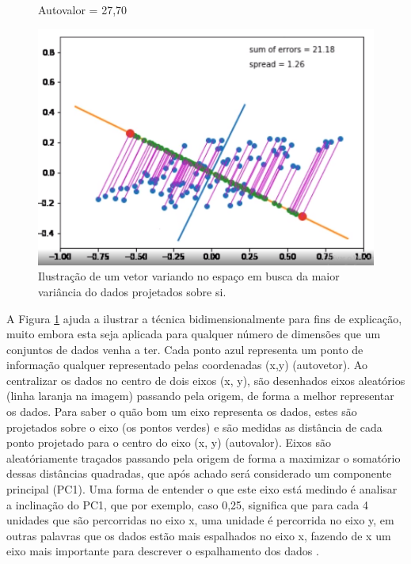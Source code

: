 \documentclass[12pt]{report}
\newcommand*{\captionsource}[2]{%
  \caption[{#1}]{%
    #1%
    \\\hspace{\linewidth}%
     \text{Fonte:}#2%
  }%
}
\begin{document}
\begin{figure}
\begin{minipage}[b]{0.4\textwidth}
    \caption{Autovalor = 27,70}
  \end{minipage}
    \hfill
  \begin{minipage}[b]{0.4\textwidth}
    \includegraphics[width=\textwidth]{images/5.png}
    \caption{Autovalor = 21,18}
  \end{minipage}
  \captionsource{Ilustração de um vetor variando no espaço em busca da maior variância do dados projetados sobre si.}{ \protect\cite{paperspace}}
  \label{fig:animacao_pca}
\end{figure}

A Figura \ref{fig:animacao_pca} ajuda a ilustrar a técnica bidimensionalmente para fins de explicação, muito embora esta seja aplicada para qualquer número de dimensões que um conjuntos de dados venha a ter. Cada ponto azul representa um ponto de informação qualquer representado pelas coordenadas (x,y) (autovetor). Ao centralizar os dados no centro de dois eixos (x, y), são desenhados eixos aleatórios (linha laranja na imagem) passando pela origem, de forma a melhor representar os dados. Para saber o quão bom um eixo representa os dados, estes são projetados sobre o eixo (os pontos verdes) e são medidas as distância de cada ponto projetado para o centro do eixo (x, y) (autovalor). Eixos são aleatóriamente traçados passando pela origem de forma a maximizar o somatório dessas distâncias quadradas, que após achado será considerado um componente principal (PC1). Uma forma de entender o que este eixo está medindo é analisar a inclinação do PC1, que por exemplo, caso 0,25, significa que para cada 4 unidades que são percorridas no eixo x, uma unidade é percorrida no eixo y, em outras palavras  que os dados estão mais espalhados no eixo x, fazendo de x um eixo mais importante para descrever o espalhamento dos dados \cite{starQuest}.
\end{document}
